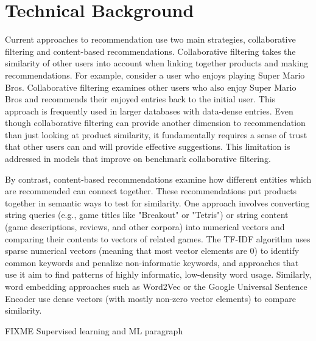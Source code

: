 \documentclass[10pt,twocolumn]{article}
\begin{document}
\section{Technical Background}
Current approaches to recommendation use two main strategies, collaborative filtering and content-based recommendations.
Collaborative filtering takes the similarity of other users
into account when linking together products and making
recommendations. For example, consider a user who enjoys playing Super Mario Bros. Collaborative filtering examines other users who also enjoy Super Mario Bros and
recommends their enjoyed entries back to the initial user.
This approach is frequently used in larger databases with
data-dense entries. Even though collaborative
filtering can provide another dimension to recommendation
than just looking at product similarity, it fundamentally requires a sense of trust that other users can and will provide
effective suggestions. This limitation is addressed in models that improve on benchmark collaborative filtering.


By contrast, content-based recommendations examine
how different entities which are recommended can connect
together. These recommendations put products together in
semantic ways to test for similarity. One approach
involves converting string queries (e.g., game titles like "Breakout" or "Tetris") or string content (game descriptions, reviews, and other corpora) into numerical vectors and comparing their contents to vectors of related games. The TF-IDF algorithm uses sparse numerical vectors (meaning that most vector elements are 0) to identify common keywords and penalize non-informatic keywords, and approaches that use it aim to find patterns of highly informatic, low-density word usage. \cite{Meidl, Zhang, DWang} Similarly, word embedding approaches such as Word2Vec \cite{Word2Vec} or the Google Universal Sentence Encoder \cite{SentenceEncoder} use dense vectors (with mostly non-zero vector elements) to compare similarity.

FIXME Supervised learning and ML paragraph

\end{document}
